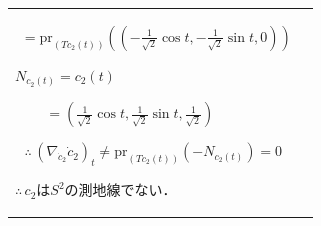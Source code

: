\documentclass[dvipdfmx, xcolor=svgnames]{beamer}
\theoremstyle{plain}
\theoremstyle{definition}
\theoremstyle{remark}
\begin{document}
{\begin{table}
\begin{tabular}{l|r}
\begin{minipage}{0.48\textwidth}
\begin{flushleft}
              \(
                  \hspace{5pt}=\mathrm{pr}_{\left(T c_2(t)\right)}((-\frac{1}{\sqrt{2}}\cos t, -\frac{1}{\sqrt{2}}\sin t, 0))
              \) 
              \vspace{8pt}

              \(N_{c_2(t)}=c_2(t)\)
              \vspace{3pt}

              \(\hspace{26pt} =(\frac{1}{\sqrt{2}}\cos t, \frac{1}{\sqrt{2}}\sin t, \frac{1}{\sqrt{2}})\)
              \vspace{-2pt}
              \end{flushleft}
              \[\therefore \, \left(\nabla_{\dot{c}_2}\dot{c}_2\right)_t \neq \mathrm{pr}_{\left(T c_2(t)\right)}(-N_{c_2(t)}) = 0 \]
              \begin{center}
              \(\therefore \, c_2\)は\(S^2\)の測地線でない．
              \end{center}
      \end{minipage}
\end{tabular}
\vspace{5pt}
\end{table}
}
\end{document}
